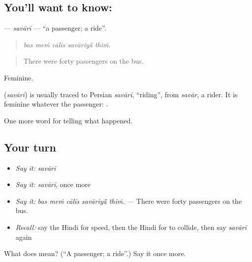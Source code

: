 \subsection*{You'll want to know: }
\textbf{} — \emph{savārī} — \textquotedblleft{}a passenger; a ride\textquotedblright{}.

\begin{quote}
    
\end{quote}

\begin{quote}
\emph{bas meṁ cālīs savāriyā̃ thīṁ.}
\end{quote}

\begin{quote}
There were forty passengers on the bus.
\end{quote}

Feminine.

\begin{cousinweb}
\textbf{} (\emph{savārī}) is usually traced to Persian \emph{savārī}, \textquotedblleft{}riding\textquotedblright{}, from \emph{savār}, a rider. It is feminine whatever the passenger: \textbf{ }.
\end{cousinweb}

\begin{grammarlens}[title={What you've built}]
One more word for telling what happened.
\end{grammarlens}

\subsection*{Your turn}
\begin{itemize}
\raggedright
  \item \emph{Say it:} \emph{savārī}
  \item \emph{Say it:} \emph{savārī}, once more
  \item \emph{Say it:} \emph{bas meṁ cālīs savāriyā̃ thīṁ.} — There were forty passengers on the bus.
  \item \emph{Recall:} say the Hindi for speed, then the Hindi for to collide, then say \emph{savārī} again
\end{itemize}

\begin{tcolorbox}[breakable,colback=teal!4,colframe=teal!35!black,title={Before you move on}]
What does  mean? (\textquotedblleft{}A passenger; a ride\textquotedblright{}.) Say it once more.
\end{tcolorbox}
